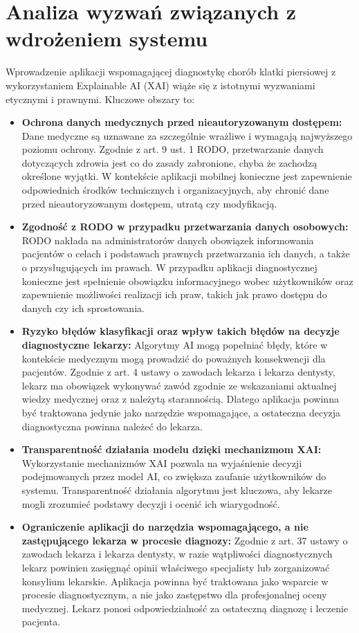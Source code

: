 \documentclass{article}
\begin{document}
\section{Analiza wyzwań związanych z wdrożeniem systemu}
Wprowadzenie aplikacji wspomagającej diagnostykę chorób klatki piersiowej z wykorzystaniem Explainable AI (XAI) wiąże się z istotnymi wyzwaniami etycznymi i prawnymi. Kluczowe obszary to:
\begin{itemize}
  \item \textbf{Ochrona danych medycznych przed nieautoryzowanym dostępem:} Dane medyczne są uznawane za szczególnie wrażliwe i wymagają najwyższego poziomu ochrony. Zgodnie z art. 9 ust. 1 RODO, przetwarzanie danych dotyczących zdrowia jest co do zasady zabronione, chyba że zachodzą określone wyjątki. W kontekście aplikacji mobilnej konieczne jest zapewnienie odpowiednich środków technicznych i organizacyjnych, aby chronić dane przed nieautoryzowanym dostępem, utratą czy modyfikacją.
  \item \textbf{Zgodność z RODO w przypadku przetwarzania danych osobowych:} RODO nakłada na administratorów danych obowiązek informowania pacjentów o celach i podstawach prawnych przetwarzania ich danych, a także o przysługujących im prawach. W przypadku aplikacji diagnostycznej konieczne jest spełnienie obowiązku informacyjnego wobec użytkowników oraz zapewnienie możliwości realizacji ich praw, takich jak prawo dostępu do danych czy ich sprostowania.
  \item \textbf{Ryzyko błędów klasyfikacji oraz wpływ takich błędów na decyzje diagnostyczne lekarzy:} Algorytmy AI mogą popełniać błędy, które w kontekście medycznym mogą prowadzić do poważnych konsekwencji dla pacjentów. Zgodnie z art. 4 ustawy o zawodach lekarza i lekarza dentysty, lekarz ma obowiązek wykonywać zawód zgodnie ze wskazaniami aktualnej wiedzy medycznej oraz z należytą starannością. Dlatego aplikacja powinna być traktowana jedynie jako narzędzie wspomagające, a ostateczna decyzja diagnostyczna powinna należeć do lekarza.
  \item \textbf{Transparentność działania modelu dzięki mechanizmom XAI:} Wykorzystanie mechanizmów XAI pozwala na wyjaśnienie decyzji podejmowanych przez model AI, co zwiększa zaufanie użytkowników do systemu. Transparentność działania algorytmu jest kluczowa, aby lekarze mogli zrozumieć podstawy decyzji i ocenić ich wiarygodność.
  \item \textbf{Ograniczenie aplikacji do narzędzia wspomagającego, a nie zastępującego lekarza w procesie diagnozy:} Zgodnie z art. 37 ustawy o zawodach lekarza i lekarza dentysty, w razie wątpliwości diagnostycznych lekarz powinien zasięgnąć opinii właściwego specjalisty lub zorganizować konsylium lekarskie. Aplikacja powinna być traktowana jako wsparcie w procesie diagnostycznym, a nie jako zastępstwo dla profesjonalnej oceny medycznej. Lekarz ponosi odpowiedzialność za ostateczną diagnozę i leczenie pacjenta.
\end{itemize}

\newpage
\printbibliography
\end{document}
